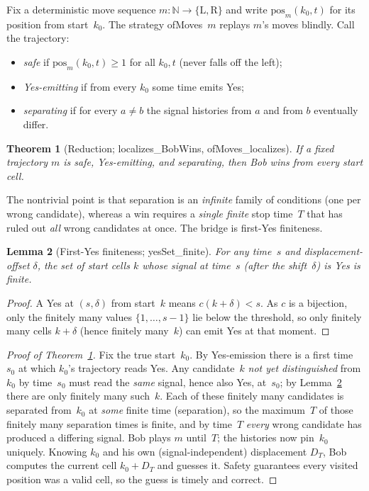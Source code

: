 \documentclass{article}
\newtheorem{theorem}{Theorem}[section]
\newtheorem{lemma}[theorem]{Lemma}
\newcommand{\N}{\mathbb{N}}
\newcommand{\Yes}{\textsf{Yes}}
\newcommand{\us}{\discretionary{}{}{}\_\discretionary{}{}{}}
\newcommand{\lean}[1]{{\small\ttfamily #1}}
\begin{document}
Fix a deterministic move sequence $m\colon \N\to\{\mathrm{L},\mathrm{R}\}$
and write $\mathrm{pos}_m(k_0,t)$ for its position from start~$k_0$. The
strategy \lean{ofMoves}~$m$ replays $m$'s moves blindly. Call the
trajectory:
\begin{itemize}[topsep=2pt,itemsep=1pt]
  \item \emph{safe} if $\mathrm{pos}_m(k_0,t)\ge 1$ for all $k_0,t$
  (never falls off the left);
  \item \emph{Yes-emitting} if from every $k_0$ some time emits \Yes;
  \item \emph{separating} if for every $a\neq b$ the signal histories from
  $a$ and from $b$ eventually differ.
\end{itemize}

\begin{theorem}[Reduction; \lean{localizes\us BobWins}, \lean{ofMoves\us localizes}]
\label{thm:reduction}
If a fixed trajectory $m$ is safe, Yes-emitting, and separating, then Bob
wins from every start cell.
\end{theorem}

The nontrivial point is that separation is an \emph{infinite} family of
conditions (one per wrong candidate), whereas a win requires a
\emph{single finite} stop time~$T$ that has ruled out \emph{all} wrong
candidates at once. The bridge is first-Yes finiteness.

\begin{lemma}[First-Yes finiteness; \lean{yesSet\us finite}]
\label{lem:yesfin}
For any time~$s$ and displacement-offset $\delta$, the set of start cells
$k$ whose signal at time~$s$ (after the shift~$\delta$) is \Yes{} is
\emph{finite}.
\end{lemma}
\begin{proof}
A \Yes{} at $(s,\delta)$ from start~$k$ means $c(k+\delta) < s$. As $c$
is a bijection, only the finitely many values $\{1,\dots,s-1\}$ lie below
the threshold, so only finitely many cells $k+\delta$ (hence finitely
many~$k$) can emit \Yes{} at that moment.
\end{proof}

\begin{proof}[Proof of Theorem~\ref{thm:reduction}]
Fix the true start~$k_0$. By Yes-emission there is a first time~$s_0$ at
which $k_0$'s trajectory reads \Yes. Any candidate~$k$ \emph{not yet
distinguished} from $k_0$ by time~$s_0$ must read the \emph{same} signal,
hence also \Yes, at~$s_0$; by Lemma~\ref{lem:yesfin} there are only
finitely many such~$k$. Each of these finitely many candidates is
separated from~$k_0$ at \emph{some} finite time (separation), so the
maximum~$T$ of those finitely many separation times is finite, and by
time~$T$ \emph{every} wrong candidate has produced a differing signal.
Bob plays $m$ until~$T$; the histories now pin~$k_0$ uniquely. Knowing
$k_0$ and his own (signal-independent) displacement $D_T$, Bob computes
the current cell $k_0 + D_T$ and guesses it. Safety guarantees every
visited position was a valid cell, so the guess is timely and correct.
\end{proof}
\end{document}
